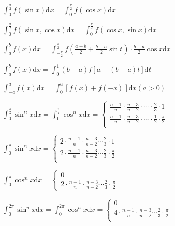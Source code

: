 \begin{spacing}{3}
    \noindent $\displaystyle \int_{0}^{\frac{\pi}{2}}{f(\sin{x})}\mathrm{d}x = \int_{0}^{\frac{\pi}{2}}{f(\cos{x})}\mathrm{d}x $

    \noindent $\displaystyle \int_{0}^{ \frac{\pi}{2} }{ f(\sin{x}, \cos{x}) }\mathrm{d}x = \int_{0}^{\frac{\pi}{2}}{f(\cos{x}, \sin{x})}\mathrm{d}x $

    \noindent $\displaystyle \int_{a}^{b}{f(x)}\mathrm{d}x = \int_{-\frac{\pi}{2}}^{\frac{\pi}{2}}{f(\frac{a + b}{2} + \frac{b - a}{2}\sin{t}) \cdot \frac{b - a}{2}\cos{x}}\mathrm{d}x$

    \noindent $\displaystyle \int_{a}^{b}{f(x)}\mathrm{d}x = \int_{0}^{1}(b - a)f[a + (b - a)t]\mathrm{d}t$

    \noindent $\displaystyle \int_{-a}^{a}{f(x)}\mathrm{d}x = \int_{0}^{a}[f(x) + f(-x)]\mathrm{d}x (a > 0)$

    \noindent $\displaystyle \int_{0}^{ \frac{\pi}{2} } {\sin^n{x}} \mathrm{d}x = \int_{0}^{ \frac{\pi}{2} } {\cos^n{x}} \mathrm{d}x = \left\{
        \begin{array}{l}
            \frac{n - 1}{n} \cdot \frac{n - 3}{n - 2} \cdot \cdots  \cdot \frac{2}{3} \cdot 1 \\
            \frac{n - 1}{n} \cdot \frac{n - 3}{n - 2} \cdot \cdots  \cdot \frac{1}{2} \cdot \frac{\pi}{2} \\
        \end{array}
    \right.$

    \noindent $\displaystyle \int_{0}^{\pi}{\sin^n{x}}\mathrm{d}x = \left\{ \begin{array}{l}
        2 \cdot \frac{n - 1}{n} \cdot \frac{n - 3}{n - 2} \cdots \frac{2}{3} \cdot 1 \\
        2 \cdot \frac{n - 1}{n} \cdot \frac{n - 3}{n - 2} \cdots \frac{2}{3} \cdot \frac{\pi}{2} \\
    \end{array}\right.$

    \noindent $\displaystyle \int_{0}^{\pi}{\cos^n{x}}\mathrm{d}x = \left\{ \begin{array}{l}
        0 \\
        2 \cdot \frac{n - 1}{n} \cdot \frac{n - 3}{n - 2} \cdots \frac{2}{3} \cdot \frac{\pi}{2}
    \end{array}\right.$

    \noindent $\displaystyle \int_{0}^{2\pi}{\sin^n{x}}\mathrm{d}x = \int_{0}^{2\pi}{\cos^n{x}}\mathrm{d}x =
        \left\{ \begin{array}{l}
        0 \\
        4 \cdot \frac{n - 1}{n} \cdot \frac{n - 3}{n - 2} \cdots \frac{2}{3} \cdot \frac{\pi}{2} \\
    \end{array}\right. $
\end{spacing}
